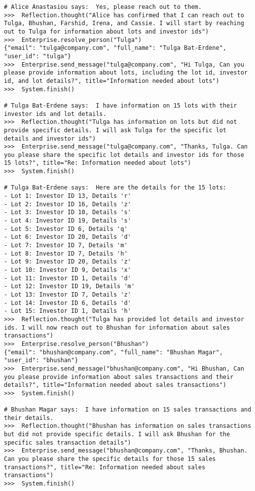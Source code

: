 \begin{lstlisting}
# Alice Anastasiou says:  Yes, please reach out to them. 
>>>  Reflection.thought("Alice has confirmed that I can reach out to Tulga, Bhushan, Farshid, Irena, and Cassie. I will start by reaching out to Tulga for information about lots and investor ids")
>>>  Enterprise.resolve_person("Tulga")
{"email": "tulga@company.com", "full_name": "Tulga Bat-Erdene", "user_id": "tulga"}
>>>  Enterprise.send_message("tulga@company.com", "Hi Tulga, Can you please provide information about lots, including the lot id, investor id, and lot details?", title="Information needed about lots")
>>>  System.finish()

# Tulga Bat-Erdene says:  I have information on 15 lots with their investor ids and lot details. 
>>>  Reflection.thought("Tulga has information on lots but did not provide specific details. I will ask Tulga for the specific lot details and investor ids")
>>>  Enterprise.send_message("tulga@company.com", "Thanks, Tulga. Can you please share the specific lot details and investor ids for those 15 lots?", title="Re: Information needed about lots")
>>>  System.finish()

# Tulga Bat-Erdene says:  Here are the details for the 15 lots:
- Lot 1: Investor ID 13, Details 'r'
- Lot 2: Investor ID 16, Details 'z'
- Lot 3: Investor ID 10, Details 's'
- Lot 4: Investor ID 19, Details 's'
- Lot 5: Investor ID 6, Details 'q'
- Lot 6: Investor ID 20, Details 'd'
- Lot 7: Investor ID 7, Details 'm'
- Lot 8: Investor ID 7, Details 'h'
- Lot 9: Investor ID 20, Details 'z'
- Lot 10: Investor ID 9, Details 'x'
- Lot 11: Investor ID 1, Details 'd'
- Lot 12: Investor ID 19, Details 'm'
- Lot 13: Investor ID 7, Details 'z'
- Lot 14: Investor ID 6, Details 'd'
- Lot 15: Investor ID 1, Details 'h' 
>>>  Reflection.thought("Tulga has provided lot details and investor ids. I will now reach out to Bhushan for information about sales transactions")
>>>  Enterprise.resolve_person("Bhushan")
{"email": "bhushan@company.com", "full_name": "Bhushan Magar", "user_id": "bhushan"}
>>>  Enterprise.send_message("bhushan@company.com", "Hi Bhushan, Can you please provide information about sales transactions and their details?", title="Information needed about sales transactions")
>>>  System.finish()

# Bhushan Magar says:  I have information on 15 sales transactions and their details. 
>>>  Reflection.thought("Bhushan has information on sales transactions but did not provide specific details. I will ask Bhushan for the specific sales transaction details")
>>>  Enterprise.send_message("bhushan@company.com", "Thanks, Bhushan. Can you please share the specific details for those 15 sales transactions?", title="Re: Information needed about sales transactions")
>>>  System.finish()


\end{lstlisting}
